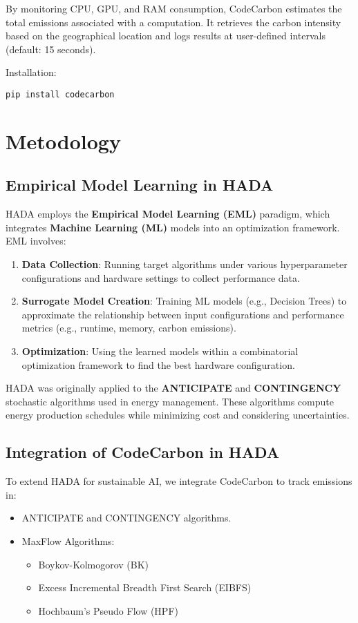 \documentclass[a4paper,singleside,12pt]{report} %
\begin{document}
By monitoring CPU, GPU, and RAM consumption, CodeCarbon estimates the total emissions associated with a computation. 
It retrieves the carbon intensity based on the geographical location and logs results at user-defined intervals 
(default: 15 seconds).

Installation:
\begin{verbatim}
pip install codecarbon
\end{verbatim}

\chapter{Metodology}

\section{Empirical Model Learning in HADA}

HADA employs the \textbf{Empirical Model Learning (EML)} paradigm, which integrates \textbf{Machine Learning (ML)} models 
into an optimization framework. EML involves:

\begin{enumerate}
\item \textbf{Data Collection}: Running target algorithms under various hyperparameter configurations and hardware settings 
to collect performance data.
\item \textbf{Surrogate Model Creation}: Training ML models (e.g., Decision Trees) to approximate the relationship between 
input configurations and performance metrics (e.g., runtime, memory, carbon emissions).
\item \textbf{Optimization}: Using the learned models within a combinatorial optimization framework to find the best hardware
 configuration.
\end{enumerate}

HADA was originally applied to the \textbf{ANTICIPATE} and \textbf{CONTINGENCY} stochastic algorithms used in energy 
management. These algorithms compute energy production schedules while minimizing cost and considering uncertainties.

\section{Integration of CodeCarbon in HADA}

To extend HADA for sustainable AI, we integrate CodeCarbon to track emissions in:
\begin{itemize}
\item ANTICIPATE and CONTINGENCY algorithms.
\item MaxFlow Algorithms:
\begin{itemize}
\item Boykov-Kolmogorov (BK)
\item Excess Incremental Breadth First Search (EIBFS)
\item Hochbaum's Pseudo Flow (HPF)
\end{itemize}
\end{itemize}
\end{document}
